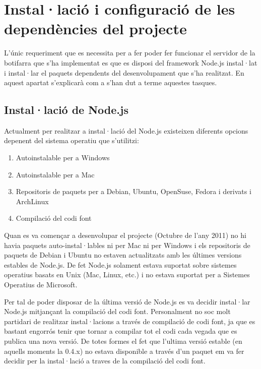 \chapter{Instal·lació i configuració de les dependències del projecte}
\label{chap:dependencies}


L'únic requeriment que es necessita per a fer poder fer funcionar el servidor de la botifarra que s'ha implementat es que es disposi del framework Node.js instal·lat i instal·lar el paquets dependents del desenvolupament que s'ha realitzat. En aquest apartat s'explicarà com a s'han dut a terme aquestes tasques. 

\section{Instal·lació de Node.js}
\label{sec:instalacio-Node.js}
Actualment per realitzar a instal·lació del Node.js existeixen diferents opcions depenent del sistema operatiu que s'utilitzi: 

\begin{enumerate}
    \item{Autoinstalable per a Windows}
    \item{Autoinstalable per a Mac}
    \item{Repositoris de paquets per a Debian, Ubuntu, OpenSuse, Fedora i derivats i ArchLinux}
    \item{Compilació del codi font}
\end{enumerate}

Quan es va començar a desenvolupar el projecte (Octubre de l'any 2011) no hi havia paquets auto-instal·lables ni per Mac ni per Windows i els repositoris de paquets de Debian i Ubuntu no estaven actualitzats amb les últimes versions estables de Node.js. De fet Node.js solament estava suportat sobre sistemes operatius basats en Unix (Mac, Linux, etc.) i no estava suportat per a Sistemes Operatius de Microsoft. 

Per tal de poder disposar de la última versió de Node.js es va decidir instal·lar Node.js mitjançant la compilació del codi font. Personalment no soc molt partidari de realitzar instal·lacions a través de compilació de codi font, ja que es bastant engorrós tenir que tornar a compilar tot el codi cada vegada que es publica una nova versió. De totes formes el fet que l'ultima versió estable (en aquells moments la 0.4.x) no estava disponible a través d'un paquet em va fer decidir per la instal·lació a traves de la compilació del codi font. 

